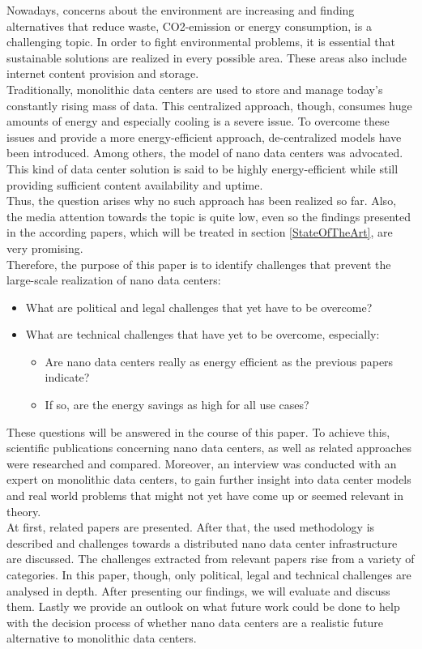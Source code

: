 Nowadays, concerns about the environment are increasing and finding alternatives that reduce waste, CO2-emission or energy consumption, is a challenging topic. In order to fight environmental problems, it is essential that sustainable solutions are realized in every possible area. These areas also include internet content provision and storage.\\ Traditionally, monolithic data centers are used to store and manage today's constantly rising mass of data. This centralized approach, though, consumes huge amounts of energy and especially cooling is a severe issue. To overcome these issues and provide a more energy-efficient approach, de-centralized models have been introduced. Among others, the model of nano data centers was advocated. This kind of data center solution is said to be highly energy-efficient while still providing sufficient content availability and uptime.\\ 
Thus, the question arises why no such approach has been realized so far. Also, the media attention towards the topic is quite low, even so the findings presented in the according papers, which will be treated in section \ref{StateOfTheArt}, are very promising. \\
Therefore, the purpose of this paper is to identify challenges that prevent the large-scale realization of nano data centers: 
\begin{itemize}
\item What are political and legal challenges that yet have to be overcome?
\item What are technical challenges that have yet to be overcome, especially:
\begin{itemize} 
\item Are nano data centers really as energy efficient as the previous papers indicate? 
\item If so, are the energy savings as high for all use cases? 
\end{itemize}
\end{itemize}
These questions will be answered in the course of this paper. To achieve this, scientific publications concerning nano data centers, as well as related approaches were researched and compared. Moreover, an interview was conducted with an expert on monolithic data centers, to gain further insight into data center models and real world problems that might not yet have come up or seemed relevant in theory.\\
At first, related papers are presented. After that, the used methodology is described and challenges towards a distributed nano data center infrastructure are discussed. The challenges extracted from relevant papers rise from a variety of categories. In this paper, though, only political, legal and technical challenges are analysed in depth. After presenting our findings, we will evaluate and discuss them. Lastly we provide an outlook on what future work could be done to help with the decision process of whether nano data centers are a realistic future alternative to monolithic data centers.

